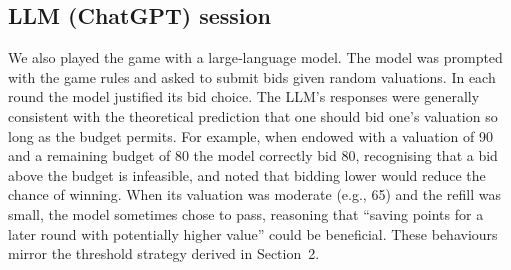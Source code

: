 \subsection{LLM (ChatGPT) session}
We also played the game with a large‑language model.  The model was prompted with the game rules and asked to submit bids given random valuations.  In each round the model justified its bid choice.  The LLM’s responses were generally consistent with the theoretical prediction that one should bid one’s valuation so long as the budget permits.  For example, when endowed with a valuation of 90 and a remaining budget of 80 the model correctly bid 80, recognising that a bid above the budget is infeasible, and noted that bidding lower would reduce the chance of winning.  When its valuation was moderate (e.g., 65) and the refill was small, the model sometimes chose to pass, reasoning that ``saving points for a later round with potentially higher value'' could be beneficial.  These behaviours mirror the threshold strategy derived in Section~2.

